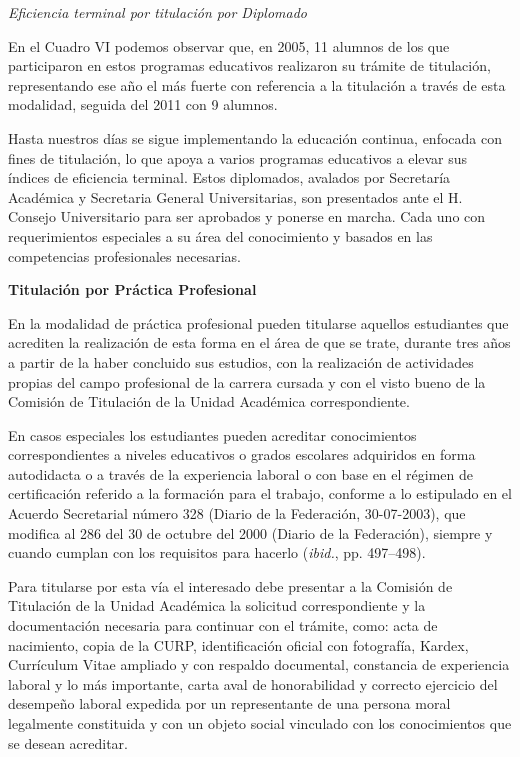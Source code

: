 \textit{Eficiencia terminal  por titulación por Diplomado}
\enlargethispage{1\baselineskip}

En el Cuadro VI podemos observar que, en 2005, 11 alumnos de los que
participaron en estos programas educativos realizaron su trámite de
titulación, representando ese año el más fuerte con referencia a la
titulación a través de esta modalidad, seguida del 2011 con 9 alumnos.

Hasta nuestros días se sigue implementando la educación continua, enfocada
con fines de titulación, lo que apoya a varios programas educativos a
elevar sus índices de eficiencia terminal. Estos diplomados, avalados por
Secretaría Académica y Secretaria General Universitarias, son presentados
ante el H. Consejo Universitario para ser aprobados y ponerse en marcha.
Cada uno con requerimientos especiales a su área del conocimiento y basados
en las competencias profesionales necesarias.

\textbf{Titulación por Práctica Profesional}
\enlargethispage{1\baselineskip}

En la modalidad de práctica profesional pueden titularse aquellos
estudiantes que acrediten la realización de esta forma en el área de que se
trate, durante tres años a partir de la haber concluido sus estudios, con
la realización de actividades propias del campo profesional de la carrera
cursada y con el visto bueno de la Comisión de Titulación de la Unidad
Académica correspondiente.


En casos especiales los estudiantes pueden acreditar conocimientos
correspondientes a niveles educativos o grados escolares adquiridos en
forma autodidacta o a través de la experiencia laboral o con base en el
régimen de certificación referido a la formación para el trabajo, conforme
a lo estipulado en el Acuerdo Secretarial número 328 (Diario de la
Federación, 30-07-2003), que modifica al 286 del 30 de octubre del 2000
(Diario de la Federación), siempre y cuando cumplan con los requisitos para
hacerlo (\textit{ibid.}, pp. 497--498).

Para titularse por esta vía el interesado debe presentar a la Comisión de
Titulación de la Unidad Académica la solicitud correspondiente y la
documentación necesaria para continuar con el trámite, como: acta de
nacimiento, copia de la CURP, identificación oficial con fotografía,
Kardex, Currículum Vitae ampliado y con respaldo documental, constancia de
experiencia laboral y lo más importante, carta aval de honorabilidad y
correcto ejercicio del desempeño laboral expedida por un representante de
una persona moral legalmente constituida y con un objeto social vinculado
con los conocimientos que se desean acreditar.

